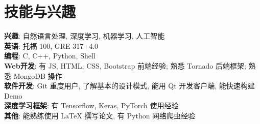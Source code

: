 \section{技能与兴趣}
\textbf{兴趣}: 自然语言处理, 深度学习, 机器学习, 人工智能\\
\textbf{英语}: 托福 100, GRE 317+4.0\\
\textbf{编程}: C, C++, Python, Shell\\
\textbf{Web开发}: 有 JS, HTML, CSS, Bootstrap 前端经验; 熟悉 Tornado 后端框架; 熟悉 MongoDB 操作\\
\textbf{软件开发}: Git 重度用户, 了解基本的设计模式, 能用 Qt 开发客户端, 能快速构建 Demo\\
\textbf{深度学习框架}: 有 Tensorflow, Keras, PyTorch 使用经验\\
\textbf{其他}: 能熟练使用 LaTeX 撰写论文, 有 Python 网络爬虫经验\\

